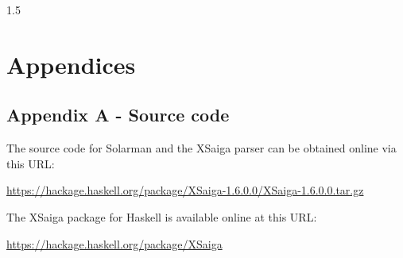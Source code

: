 \documentclass[fleqn, oneside, 12pt]{book}
\theoremstyle{definitionsty}
\newcommand{\uwinonehalfspacelen}{1.5}
\newcommand{\uwindefaultspacelen}{\uwinonehalfspacelen}
\newenvironment{uwindefaultspaceenv}%
{\begin{spacing}{\uwindefaultspacelen}}%
	{\end{spacing}}
\begin{document}
\begin{uwindefaultspaceenv}


\chapter*{Appendices}

\section*{Appendix A - Source code}

The source code for Solarman and the XSaiga parser can be obtained online via this URL:

{\noindent \small \url{https://hackage.haskell.org/package/XSaiga-1.6.0.0/XSaiga-1.6.0.0.tar.gz}}

\noindent The XSaiga package for Haskell is available online at this URL:

{\noindent \small \url{https://hackage.haskell.org/package/XSaiga}}

%
%
%
%
%
%


\end{uwindefaultspaceenv}
\end{document}
